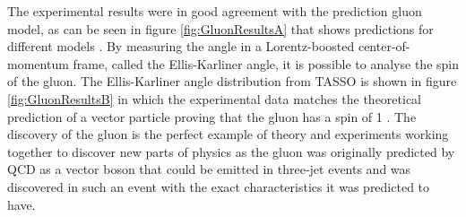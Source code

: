 The experimental results were in good agreement with the prediction gluon model, as can be seen in figure \ref{fig:GluonResultsA} that shows predictions for different models \cite{Branson:1994eu}. %
By measuring the angle in a Lorentz-boosted center-of-momentum frame, called the Ellis-Karliner angle, it is possible to analyse the spin of the gluon.
The Ellis-Karliner angle distribution from TASSO is shown in figure \ref{fig:GluonResultsB} in which the experimental data matches the theoretical prediction of a vector particle proving that the gluon has a spin of 1 \cite{Venker, Soding:1996zk}.
The discovery of the gluon is the perfect example of theory and experiments working together to discover new parts of physics as the gluon was originally predicted by QCD as a vector boson that could be emitted in three-jet events and was discovered in such an event with the exact characteristics it was predicted to have.

